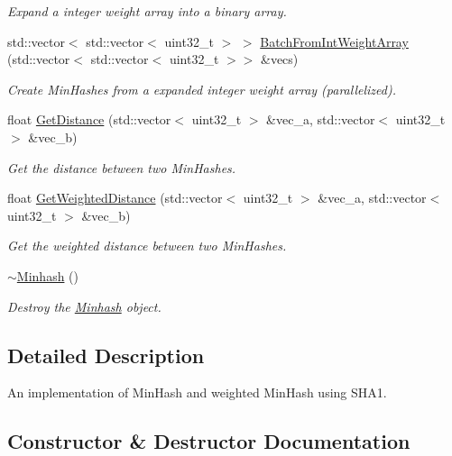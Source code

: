 \begin{DoxyCompactItemize}
\begin{DoxyCompactList}\small\item\em Expand a integer weight array into a binary array. \end{DoxyCompactList}\item 
std\+::vector$<$ std\+::vector$<$ uint32\+\_\+t $>$ $>$ \hyperlink{classMinhash_a6d468d2ee939351ffed9ea3ff8d82643}{Batch\+From\+Int\+Weight\+Array} (std\+::vector$<$ std\+::vector$<$ uint32\+\_\+t $>$$>$ \&vecs)
\begin{DoxyCompactList}\small\item\em Create Min\+Hashes from a expanded integer weight array (parallelized). \end{DoxyCompactList}\item 
float \hyperlink{classMinhash_a40dd607c20fa7c8059a3fb3d0c81ba0a}{Get\+Distance} (std\+::vector$<$ uint32\+\_\+t $>$ \&vec\+\_\+a, std\+::vector$<$ uint32\+\_\+t $>$ \&vec\+\_\+b)
\begin{DoxyCompactList}\small\item\em Get the distance between two Min\+Hashes. \end{DoxyCompactList}\item 
float \hyperlink{classMinhash_a8b2bd50a845fb4aa513464de10ed3e21}{Get\+Weighted\+Distance} (std\+::vector$<$ uint32\+\_\+t $>$ \&vec\+\_\+a, std\+::vector$<$ uint32\+\_\+t $>$ \&vec\+\_\+b)
\begin{DoxyCompactList}\small\item\em Get the weighted distance between two Min\+Hashes. \end{DoxyCompactList}\item 
\mbox{\label{classMinhash_a15a534f3f3e14c45ee20da1ed5039661}} 
\hyperlink{classMinhash_a15a534f3f3e14c45ee20da1ed5039661}{$\sim$\+Minhash} ()
\begin{DoxyCompactList}\small\item\em Destroy the \hyperlink{classMinhash}{Minhash} object. \end{DoxyCompactList}\end{DoxyCompactItemize}


\subsection{Detailed Description}
An implementation of Min\+Hash and weighted Min\+Hash using S\+H\+A1. 

\subsection{Constructor \& Destructor Documentation}
\mbox{\label{classMinhash_ad07fccee7e95ca368e5fabfb0ee76804}} 
